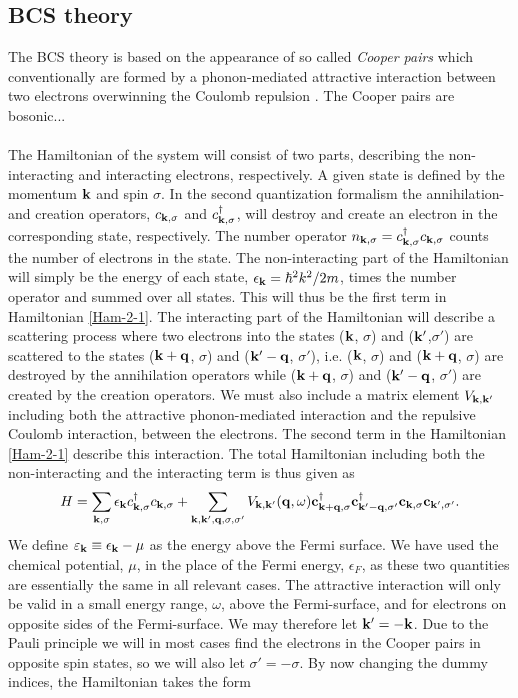 \subsection{BCS theory} \label{sec:bcs}
The BCS theory is based on the appearance of so called \textit{Cooper pairs} which conventionally are formed by a phonon-mediated attractive interaction between two electrons overwinning the Coulomb repulsion \cite{BCS57}. The Cooper pairs are bosonic...
\\
\\
The Hamiltonian of the system will consist of two parts, describing the non-interacting and interacting electrons, respectively. A given state is defined by the momentum $\bf{k}$ and spin $\sigma$. In the second quantization formalism the annihilation- and creation operators, $c_{\bf{k},\sigma}$ and $c_{\bf{k},\sigma}^{\dagger}$, will destroy and create an electron in the corresponding state, respectively. The number operator $n_{\bf{k},\sigma}=c_{\bf{k},\sigma}^{\dagger}c_{\bf{k},\sigma}$ counts the number of electrons in the state. The non-interacting part of the Hamiltonian will simply be the energy of each state, $\epsilon_{\mathbf{k}} = \hbar^2k^2/2m$, times the number operator and summed over all states. This will thus be the first term in Hamiltonian \eqref{Ham-2-1}. The interacting part of the Hamiltonian will describe a scattering process where two electrons into the states ($\bf{k}$, $\sigma$) and ($\bf{k'}$,$\sigma'$) are scattered to the states ($\bf{k+q}$, $\sigma$) and ($\bf{k'-q}$, $\sigma'$), i.e. ($\bf{k}$, $\sigma$) and  ($\bf{k+q}$, $\sigma$) are destroyed by the annihilation operators while ($\bf{k+q}$, $\sigma$) and ($\bf{k'-q}$, $\sigma'$) are created by the creation operators. We must also include a matrix element $V_{\bf{k,k'}}$ including both the attractive phonon-mediated interaction and the repulsive Coulomb interaction, between the electrons. The second term in the Hamiltonian \eqref{Ham-2-1} describe this interaction. The total Hamiltonian including both the non-interacting and the interacting term is thus given as
\begin{equation}
    H = \sum_{\bf{k},\sigma} \epsilon_{\mathbf{k}} c_{\bf{k},\sigma}^{\dagger} c_{\bf{k},\sigma} + \sum_{\bf{k,k',q},\sigma,\sigma'} V_{\bf{k,k'}}(\bf{q},\omega) c_{\bf{k+q},\sigma}^{\dagger} c_{\bf{k'-q},\sigma'}^{\dagger} c_{\bf{k},\sigma} c_{\bf{k'},\sigma'}.
    \label{Ham-2-1}
\end{equation}
We define $\varepsilon_{\mathbf{k}} \equiv \epsilon_{\mathbf{k}} - \mu$ as the energy above the Fermi surface. We have used the chemical potential, $\mu$, in the place of the Fermi energy, $\epsilon_{F}$, as these two quantities are essentially the same in all relevant cases. The attractive interaction will only be valid in a small energy range, $\omega$, above the Fermi-surface, and for electrons on opposite sides of the Fermi-surface. We may therefore let $\bf{k'}=-\bf{k}$. Due to the Pauli principle we will in most cases find the electrons in the Cooper pairs in opposite spin states, so we will also let $\sigma'=-\sigma$. By now changing the dummy indices, the Hamiltonian takes the form
